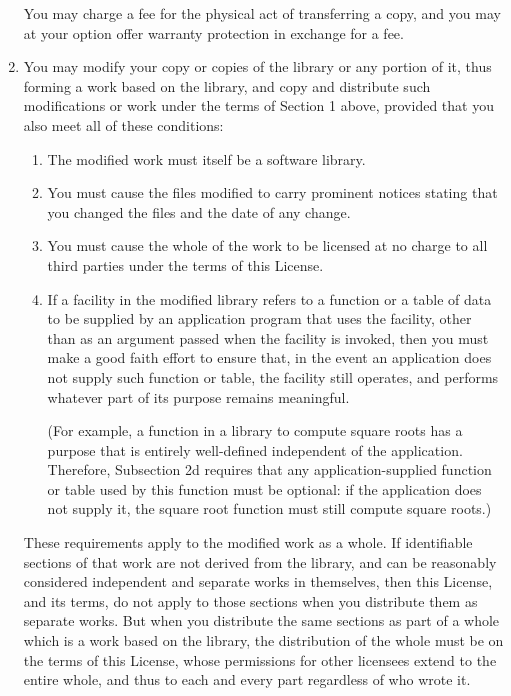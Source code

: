 \documentclass[11pt, letterpaper]{book}
\begin{document}
\begin{enumerate}
You may charge a fee for the physical act of transferring a copy,
and you may at your option offer warranty protection in exchange for a
fee.

\item

You may modify your copy or copies of the library or any portion of it,
thus forming a work based on the library, and copy and distribute such
modifications or work under the terms of Section 1 above, provided that
you also meet all of these conditions:

\begin{enumerate}

  \item

    The modified work must itself be a software library.

  \item

    You must cause the files modified to carry prominent notices stating
    that you changed the files and the date of any change.

  \item

    You must cause the whole of the work to be licensed at no charge to
    all third parties under the terms of this License.

  \item 
    If a facility in the modified library refers to a function or a table
    of data to be supplied by an application program that uses the
    facility, other than as an argument passed when the facility is
    invoked, then you must make a good faith effort to ensure that, in the
    event an application does not supply such function or table, the
    facility still operates, and performs whatever part of its purpose
    remains meaningful.

(For example, a function in a library to compute square roots has a
purpose that is entirely well-defined independent of the application.
Therefore, Subsection 2d requires that any application-supplied function
or table used by this function must be optional: if the application does
not supply it, the square root function must still compute square roots.)
\end{enumerate}

These requirements apply to the modified work as a whole. If identifiable
sections of that work are not derived from the library, and can be
reasonably considered independent and separate works in themselves, then
this License, and its terms, do not apply to those sections when you
distribute them as separate works. But when you distribute the same
sections as part of a whole which is a work based on the library, the
distribution of the whole must be on the terms of this License, whose
permissions for other licensees extend to the entire whole, and thus to
each and every part regardless of who wrote it.


\end{enumerate}
\end{document}
